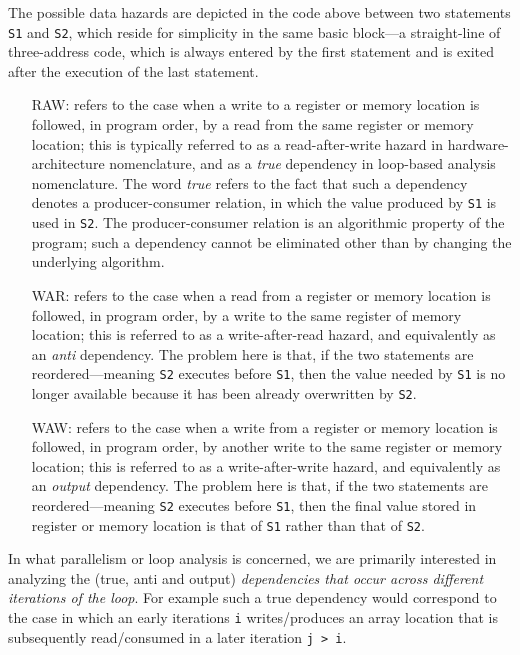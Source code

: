 \documentclass[acmsmall,review]{acmart}\settopmatter{printfolios=true,printccs=false,printacmref=false}
\begin{document}
The possible data hazards are depicted in the code above between
two statements {\tt S1} and {\tt S2}, which reside for simplicity
in the same basic block---a straight-line of three-address code, 
which is always entered by the first statement and is exited after 
the execution of the last statement. 
\begin{itemize}
    \item[RAW:] refers to the case when a write to a register or
        memory location is followed, in program order, by a read
        from the same register or memory location; this is typically
        referred to as a read-after-write hazard in hardware-architecture
        nomenclature, and as a \emph{true} dependency in loop-based analysis
        nomenclature. The word \emph{true} refers to the fact that such 
        a dependency denotes a producer-consumer relation, in which
        the value produced by {\tt S1} is used in {\tt S2}. The 
        producer-consumer relation is an algorithmic property of the 
        program; such a dependency cannot be eliminated other than 
        by changing the underlying algorithm.
    \item[WAR:] refers to the case when a read from a register or
        memory location is followed, in program order, by a write to
        the same register of memory location; this is referred to
        as a write-after-read hazard, and equivalently as an
        \emph{anti} dependency. The problem here is that, if the
        two statements are reordered---meaning {\tt S2} executes
        before {\tt S1}, then the value needed by {\tt S1} is no
        longer available because it has been already overwritten
        by {\tt S2}.
    \item[WAW:] refers to the case when a write from a register or
        memory location is followed, in program order, by another
        write to the same register or memory location; this is
        referred to as a write-after-write hazard, and equivalently 
        as an \emph{output} dependency. The problem here is that, 
        if the two statements are reordered---meaning {\tt S2} executes
        before {\tt S1}, then the final value stored in register 
        or memory location is that of {\tt S1} rather than that of 
        {\tt S2}.
\end{itemize}

In what parallelism or loop analysis is concerned, we are primarily
interested in analyzing the (true, anti and output) \emph{dependencies 
that occur across different iterations of the loop}. For example such
a true dependency would correspond to the case in which an early
iterations {\tt i} writes/produces an array location that is 
subsequently read/consumed in a later iteration {\tt j > i}.
\end{document}
